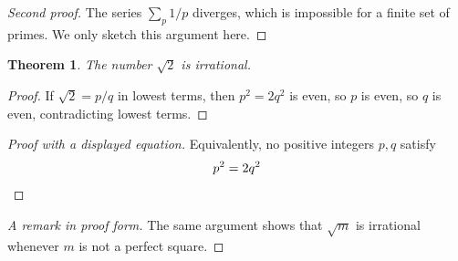 \documentclass[11pt]{article}
\newtheorem{theorem}{Theorem}
\begin{document}
\begin{proof}[Second proof]
The series $\sum_p 1/p$ diverges, which is impossible for a finite set of
primes. We only sketch this argument here.
\end{proof}

\renewcommand{\qedsymbol}{$\blacksquare$}

\begin{theorem}
The number $\sqrt{2}$ is irrational.
\end{theorem}

\begin{proof}
If $\sqrt{2} = p/q$ in lowest terms, then $p^2 = 2q^2$ is even, so $p$ is
even, so $q$ is even, contradicting lowest terms.
\end{proof}

\begin{proof}[Proof with a displayed equation]
Equivalently, no positive integers $p, q$ satisfy
\begin{equation}
  p^2 = 2q^2 \qedhere
\end{equation}
\end{proof}

\renewcommand{\qedsymbol}{\textsc{qed}}

\begin{proof}[A remark in proof form]
The same argument shows that $\sqrt{m}$ is irrational whenever $m$ is not a
perfect square.
\end{proof}
\end{document}
